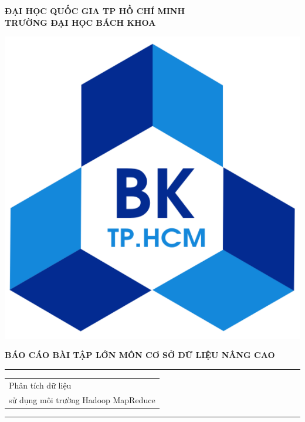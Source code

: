 \documentclass{hcmutarticle}
\begin{document}
\thispagestyle{empty}
\begin{center}
\LARGE\bfseries ĐẠI HỌC QUỐC GIA TP HỒ CHÍ MINH \\
TRƯỜNG ĐẠI HỌC BÁCH KHOA
\end{center}

\begin{center}
\includegraphics[scale=0.2]{hcmut.pdf}\\[1cm]
\end{center}

\vspace{1cm}

\begin{center}
\Large \bfseries BÁO CÁO BÀI TẬP LỚN MÔN CƠ SỞ DỮ LIỆU NÂNG CAO\\[0.5cm]
\end{center}
\rule{\textwidth}{1pt}
\vspace{2pt}
\begin{center}
\Huge
\begin{tabular}{@{}l}
Phân tích dữ liệu\\ sử dụng môi trường Hadoop MapReduce
\end{tabular}
\end{center}
\rule{\textwidth}{1pt}\\[1cm]
\end{document}
